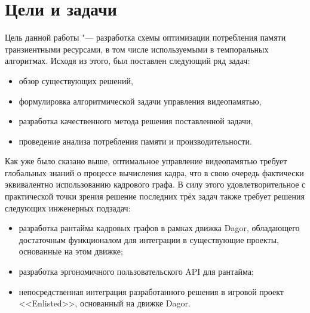\section{Цели и задачи}
Цель данной работы "--- разработка схемы оптимизации потребления памяти транзиентными ресурсами, в том числе используемыми в темпоральных алгоритмах. Исходя из этого, был поставлен следующий ряд задач:
\begin{itemize}
    \item обзор существующих решений,
    \item формулировка алгоритмической задачи управления видеопамятью,
    \item разработка качественного метода решения поставленной задачи,
    \item проведение анализа потребления памяти и производительности.
\end{itemize}
Как уже было сказано выше, оптимальное управление видеопамятью требует глобальных знаний о процессе вычисления кадра, что в свою очередь фактически эквивалентно использованию кадрового графа.
В силу этого удовлетворительное с практической точки зрения решение последних трёх задач также требует решения следующих инженерных подзадач:
\begin{itemize}
    \item разработка рантайма кадровых графов в рамках движка Dagor, обладающего достаточным функционалом для интеграции в существующие проекты, основанные на этом движке;
    \item разработка эргономичного пользовательского API для рантайма;
    \item непосредственная интеграция разработанного решения в игровой проект <<Enlisted>>, основанный на движке Dagor.
\end{itemize}
